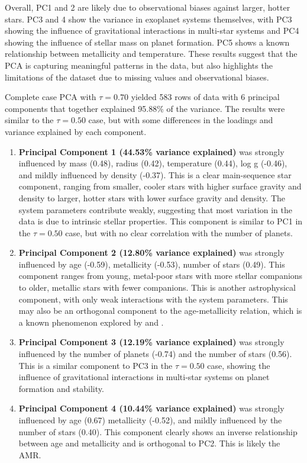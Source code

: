 \documentclass[preprint]{aastex631}
\begin{document}
Overall, PC1 and 2 are likely due to observational biases against larger, hotter stars. PC3 and 4 show the variance in exoplanet systems themselves, with PC3 showing the influence of gravitational interactions in multi-star systems and PC4 showing the influence of stellar mass on planet formation. PC5 shows a known relationship between metallicity and temperature. These results suggest that the PCA is capturing meaningful patterns in the data, but also highlights the limitations of the dataset due to missing values and observational biases.

Complete case PCA with $\tau=0.70$ yielded 583 rows of data with 6 principal components that together explained 95.88\% of the variance. The results were similar to the $\tau=0.50$ case, but with some differences in the loadings and variance explained by each component.
\begin{enumerate}
  \item \textbf{Principal Component 1 (44.53\% variance explained)} was strongly influenced by mass (0.48), radius (0.42), temperature (0.44), log g (-0.46), and mildly influenced by density (-0.37). This is a clear main-sequence star component, ranging from smaller, cooler stars with higher surface gravity and density to larger, hotter stars with lower surface gravity and density. The system parameters contribute weakly, suggesting that most variation in the data is due to intrinsic stellar properties. This component is similar to PC1 in the $\tau=0.50$ case, but with no clear correlation with the number of planets.
  \item \textbf{Principal Component 2 (12.80\% variance explained)} was strongly influenced by age (-0.59), metallicity (-0.53), number of stars (0.49). This component ranges from young, metal-poor stars with more stellar companions to older, metallic stars with fewer companions. This is another astrophysical component, with only weak interactions with the system parameters. This may also be an orthogonal component to the age-metallicity relation, which is a known phenomenon explored by \citet{twarogChemicalEvolutionSolar1980} and \citet{edvardssonChemicalEvolutionGalactic1993}.
  \item \textbf{Principal Component 3 (12.19\% variance explained)} was strongly influenced by the number of planets (-0.74) and the number of stars (0.56). This is a similar component to PC3 in the $\tau=0.50$ case, showing the influence of gravitational interactions in multi-star systems on planet formation and stability.
  \item \textbf{Principal Component 4 (10.44\% variance explained)} was strongly influenced by age (0.67) metallicity (-0.52), and mildly influenced by the number of stars (0.40). This component clearly shows an inverse relationship between age and metallicity and is orthogonal to PC2. This is likely the AMR. 

\end{enumerate}
\end{document}
